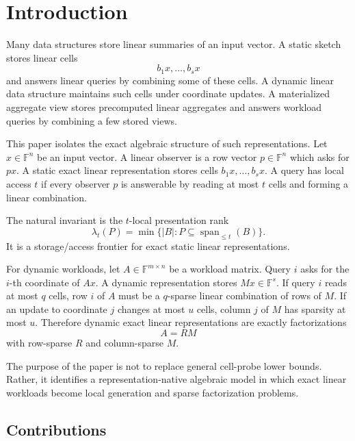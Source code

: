 \documentclass[11pt]{article}
\begin{document}
\section{Introduction}

Many data structures store linear summaries of an input vector. A static sketch stores linear cells
\[
b_1x,\ldots,b_sx
\]
and answers linear queries by combining some of these cells. A dynamic linear data structure maintains such cells under coordinate updates. A materialized aggregate view stores precomputed linear aggregates and answers workload queries by combining a few stored views.

This paper isolates the exact algebraic structure of such representations. Let $x\in\mathbb F^n$ be an input vector. A linear observer is a row vector $p\in\mathbb F^n$ which asks for $px$. A static exact linear representation stores cells $b_1x,\ldots,b_sx$. A query has local access $t$ if every observer $p$ is answerable by reading at most $t$ cells and forming a linear combination.

The natural invariant is the $t$-local presentation rank
\[
\lambda_t(P)
=
\min\{|B|:P\subseteq \operatorname{span}_{\le t}(B)\}.
\]
It is a storage/access frontier for exact static linear representations.

For dynamic workloads, let $A\in\mathbb F^{m\times n}$ be a workload matrix. Query $i$ asks for the $i$-th coordinate of $Ax$. A dynamic representation stores $Mx\in\mathbb F^s$. If query $i$ reads at most $q$ cells, row $i$ of $A$ must be a $q$-sparse linear combination of rows of $M$. If an update to coordinate $j$ changes at most $u$ cells, column $j$ of $M$ has sparsity at most $u$. Therefore dynamic exact linear representations are exactly factorizations
\[
A=RM
\]
with row-sparse $R$ and column-sparse $M$.

The purpose of the paper is not to replace general cell-probe lower bounds. Rather, it identifies a representation-native algebraic model in which exact linear workloads become local generation and sparse factorization problems.

\subsection{Contributions}
\end{document}
